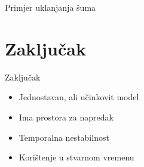 \documentclass[12pt]{beamer}
\begin{document}
                \begin{frame}{Primjer uklanjanja šuma}
      \begin{center}
      \end{center}
    \end{frame}

  \section{Zaključak}

  \begin{frame}{Zaključak}
    \begin{itemize}
    \item Jednostavan, ali učinkovit model
    \item Ima prostora za napredak
    \item Temporalna nestabilnost
    \item Korištenje u stvarnom vremenu
    \end{itemize}
  \end{frame}
\end{document}
